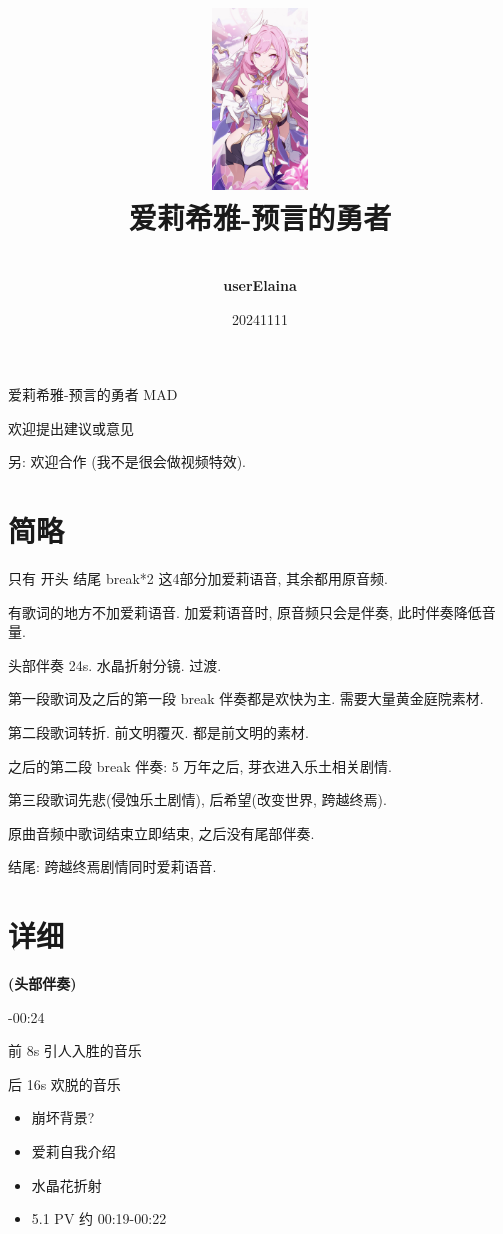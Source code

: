 \documentclass[a4paper]{article}
\title{
    \vspace*{1.0in}
    \includegraphics[width=1in]{figures/100154449_p0.jpg} \\
    \vspace*{1in}
    \textbf{\Huge 爱莉希雅-预言的勇者}
    \vspace{0.5in}
}
\author{ \\
    \textbf{\huge userElaina} \\
    \vspace*{1in}
}
\date{\LARGE 20241111}
\begin{document}
\LARGE

\maketitle
\tableofcontents
\thispagestyle{empty}
\newpage

爱莉希雅-预言的勇者 MAD

欢迎提出建议或意见

另: 欢迎合作 (我不是很会做视频特效).

\section{简略}

只有 开头 结尾 break*2 这4部分加爱莉语音, 其余都用原音频.

有歌词的地方不加爱莉语音. 加爱莉语音时, 原音频只会是伴奏, 此时伴奏降低音量.

头部伴奏 24s. 水晶折射分镜. 过渡.

第一段歌词及之后的第一段 break 伴奏都是欢快为主. 需要大量黄金庭院素材.

第二段歌词转折. 前文明覆灭. 都是前文明的素材.

之后的第二段 break 伴奏: 5 万年之后, 芽衣进入乐土相关剧情.

第三段歌词先悲(侵蚀乐土剧情), 后希望(改变世界, 跨越终焉).

原曲音频中歌词结束立即结束, 之后没有尾部伴奏.

结尾: 跨越终焉剧情同时爱莉语音.

\section{详细}

\textbf{(头部伴奏)}

-00:24

前 8s 引人入胜的音乐

后 16s 欢脱的音乐

\begin{itemize}
    \item 崩坏背景?
    \item 爱莉自我介绍
    \item 水晶花折射
\end{itemize}

\begin{itemize}
    \item 5.1 PV 约 00:19-00:22
\end{itemize}
\end{document}
